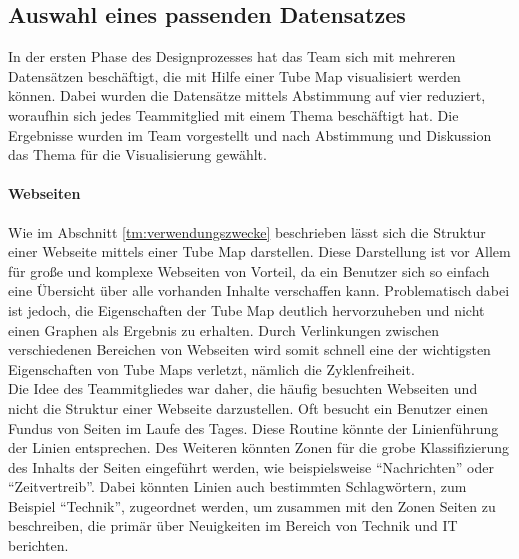 \subsection{Auswahl eines passenden Datensatzes}
In der ersten Phase des Designprozesses hat das Team sich mit mehreren Datensätzen beschäftigt, die mit Hilfe einer Tube Map visualisiert werden können. Dabei wurden die Datensätze mittels Abstimmung auf vier reduziert, woraufhin sich jedes Teammitglied mit einem Thema beschäftigt hat. Die Ergebnisse wurden im Team vorgestellt und nach Abstimmung und Diskussion das Thema für die Visualisierung gewählt.

\paragraph{Webseiten}
Wie im Abschnitt \ref{tm:verwendungszwecke} beschrieben lässt sich die Struktur einer Webseite mittels einer Tube Map darstellen.  Diese Darstellung ist vor Allem für große und komplexe Webseiten von Vorteil, da ein Benutzer sich so einfach eine Übersicht über alle vorhanden Inhalte verschaffen kann. Problematisch dabei ist jedoch, die Eigenschaften der Tube Map deutlich hervorzuheben und nicht einen Graphen als Ergebnis zu erhalten. Durch Verlinkungen zwischen verschiedenen Bereichen von Webseiten wird somit schnell eine der wichtigsten Eigenschaften von Tube Maps verletzt, nämlich die Zyklenfreiheit. \\
Die Idee des Teammitgliedes war daher, die häufig besuchten Webseiten und nicht die Struktur einer Webseite darzustellen. Oft besucht ein Benutzer einen Fundus von Seiten im Laufe des Tages. Diese Routine könnte der Linienführung der Linien entsprechen. Des Weiteren könnten Zonen für die grobe Klassifizierung des Inhalts der Seiten eingeführt werden, wie beispielsweise "`Nachrichten"' oder "`Zeitvertreib"'. Dabei könnten Linien auch bestimmten Schlagwörtern, zum Beispiel "`Technik"', zugeordnet werden, um zusammen mit den Zonen Seiten zu beschreiben, die primär über Neuigkeiten im Bereich von Technik und IT berichten. 

